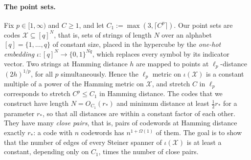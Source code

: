 \documentclass[11pt]{article}
\theoremstyle{definition}
\theoremstyle{remark}
\begin{document}
\paragraph{The point sets.}
Fix $p \in [1, \infty)$ and $C \ge 1$, and let $C_1 := \max(3, \lceil C^p \rceil)$. Our point sets are codes $\mathcal{X} \subseteq [q]^N$, that is, sets of strings of length $N$ over an alphabet $[q] = \{1, \dots, q\}$ of constant size, placed in the hypercube by the \emph{one-hot embedding} $\iota : [q]^N \to \{0, 1\}^{N q}$, which replaces every symbol by its indicator vector. Two strings at Hamming distance $h$ are mapped to points at $\ell_p$-distance $(2h)^{1/p}$, for all $p$ simultaneously. Hence the $\ell_p$ metric on $\iota(\mathcal{X})$ is a constant multiple of a power of the Hamming metric on $\mathcal{X}$, and stretch $C$ in $\ell_p$ corresponds to stretch $C^p \le C_1$ in Hamming distance. The codes that we construct have length $N = O_{C_1}(r_*)$ and minimum distance at least $\frac{1}{2} r_*$ for a parameter $r_*$, so that all distances are within a constant factor of each other. They have many \emph{close pairs}, that is, pairs of codewords at Hamming distance exactly $r_*$: a code with $n$ codewords has $n^{1 + \Omega(1)}$ of them. The goal is to show that the number of edges of every Steiner spanner of $\iota(\mathcal{X})$ is at least a constant, depending only on $C_1$, times the number of close pairs.
\end{document}
